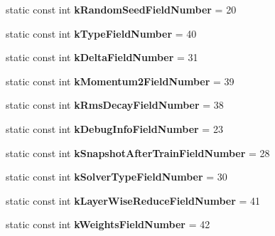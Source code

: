 \begin{DoxyCompactItemize}
static const int {\bfseries k\+Random\+Seed\+Field\+Number} = 20
\item 
\mbox{\label{classcaffe_1_1_solver_parameter_a5e8dc6897214be5897a6ba1b27e4a5b7}} 
static const int {\bfseries k\+Type\+Field\+Number} = 40
\item 
\mbox{\label{classcaffe_1_1_solver_parameter_acbf3c1a689d488ec99a61e9df9499e2e}} 
static const int {\bfseries k\+Delta\+Field\+Number} = 31
\item 
\mbox{\label{classcaffe_1_1_solver_parameter_a3f97267a26d3f029a4697fd154a630f0}} 
static const int {\bfseries k\+Momentum2\+Field\+Number} = 39
\item 
\mbox{\label{classcaffe_1_1_solver_parameter_a4c13244d5499b7c52575833c1c1a2c95}} 
static const int {\bfseries k\+Rms\+Decay\+Field\+Number} = 38
\item 
\mbox{\label{classcaffe_1_1_solver_parameter_a716e89e9c5849cf5313ee64badec152e}} 
static const int {\bfseries k\+Debug\+Info\+Field\+Number} = 23
\item 
\mbox{\label{classcaffe_1_1_solver_parameter_af35f1e6bea2c1cbf5fff226ef41ab982}} 
static const int {\bfseries k\+Snapshot\+After\+Train\+Field\+Number} = 28
\item 
\mbox{\label{classcaffe_1_1_solver_parameter_aa34fb2c626bfdbc64eda2024e8d049d4}} 
static const int {\bfseries k\+Solver\+Type\+Field\+Number} = 30
\item 
\mbox{\label{classcaffe_1_1_solver_parameter_a3b131c8dbf9d4a4a1727a530974518a0}} 
static const int {\bfseries k\+Layer\+Wise\+Reduce\+Field\+Number} = 41
\item 
\mbox{\label{classcaffe_1_1_solver_parameter_a24b404e9b2d543641defe2bba026f405}} 
static const int {\bfseries k\+Weights\+Field\+Number} = 42
\end{DoxyCompactItemize}
